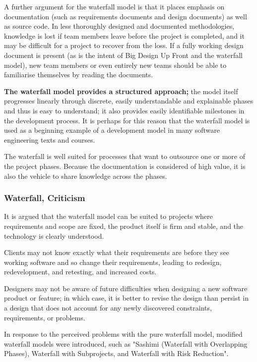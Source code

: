 A further argument for the waterfall model is that it places emphasis
on documentation (such as requirements documents and design documents)
as well as source code. In less thoroughly designed and documented
methodologies, knowledge is lost if team members leave before the
project is completed, and it may be difficult for a project to recover
from the loss. If a fully working design document is present (as is
the intent of Big Design Up Front and the waterfall model), new team
members or even entirely new teams should be able to familiarise
themselves by reading the documents.

\textbf{The waterfall model provides a structured approach;} the model itself
progresses linearly through discrete, easily understandable and
explainable phases and thus is easy to understand; it also provides
easily identifiable milestones in the development process. It is
perhaps for this reason that the waterfall model is used as a
beginning example of a development model in many software engineering
texts and courses.

The waterfall is well suited for processes that want to outsource one
or more of the project phases. Because the documentation is considered
of high value, it is also the vehicle to share knowledge across the
phases.

\subsubsection{Waterfall, Criticism}
It is argued that the waterfall model can be suited to projects where
requirements and scope are fixed, the product itself is firm and
stable, and the technology is clearly understood.
\begin{itemize*}
\item Clients may not know exactly what their requirements are before they
see working software and so change their requirements, leading to
redesign, redevelopment, and retesting, and increased costs. 
\item Designers may not be aware of future difficulties when designing a new
software product or feature; in which case, it is better to revise the
design than persist in a design that does not account for any newly
discovered constraints, requirements, or problems.
\end{itemize*}
In response to the perceived problems with the pure waterfall model,
modified waterfall models were introduced, such as "Sashimi (Waterfall
with Overlapping Phases), Waterfall with Subprojects, and Waterfall
with Risk Reduction".

